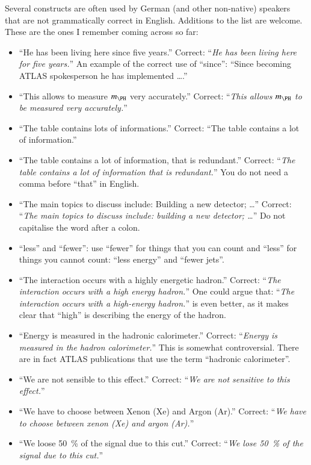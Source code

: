 Several constructs are often used by German (and other non-native) speakers
that are not grammatically correct in English.
Additions to the list are welcome.
These are the ones I remember coming across so far:
\begin{itemize}
\item \enquote{He has been living here since five years.}
  Correct: \enquote{\emph{He has been living here for five years.}}
  An example of the correct use of \enquote{since}:
  \enquote{Since becoming ATLAS spokesperson he has implemented \ldots.}
\item \enquote{This allows to measure \(m_{\PH}\) very accurately.}
  Correct: \enquote{\emph{This allows \(m_{\PH}\) to be measured very accurately.}}
\item \enquote{The table contains lots of informations.}
  Correct: \enquote{The table contains a lot of information.}
\item \enquote{The table contains a lot of information, that is redundant.}
  Correct: \enquote{\emph{The table contains a lot of information that is redundant.}}
  You do not need a comma before \enquote{that} in English.
\item \enquote{The main topics to discuss include: Building a new detector; \ldots}
  Correct: \enquote{\emph{The main topics to discuss include: building a new detector; \ldots}}
  Do not capitalise the word after a colon.
\item \enquote{less} and \enquote{fewer}: use \enquote{fewer} for things that you can count and
  \enquote{less} for things you cannot count: \enquote{less energy} and \enquote{fewer jets}.
\item \enquote{The interaction occurs with a highly energetic hadron.}
  Correct: \enquote{\emph{The interaction occurs with a high energy hadron.}}
  One could argue that: \enquote{\emph{The interaction occurs with a high-energy hadron.}}
  is even better, as it makes clear that \enquote{high} is describing the energy of the hadron.
\item \enquote{Energy is measured in the hadronic calorimeter.}
  Correct: \enquote{\emph{Energy is measured in the hadron calorimeter.}}
  This is somewhat controversial.
  There are in fact ATLAS publications that use the term \enquote{hadronic calorimeter}.
\item \enquote{We are not sensible to this effect.}
  Correct: \enquote{\emph{We are not sensitive to this effect.}}
\item \enquote{We have to choose between Xenon (Xe)  and Argon (Ar).}
  Correct: \enquote{\emph{We have to choose between xenon (Xe) and argon (Ar).}}
\item \enquote{We loose \SI{50}{\%} of the signal due to this cut.}
  Correct: \enquote{\emph{We lose \SI{50}{\%} of the signal due to this cut.}}
\end{itemize}

